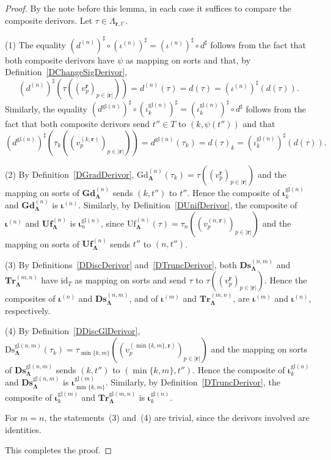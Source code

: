 \documentclass[a4paper, reqno
]{amsart}
\newcommand{\bb}[1]{\ensuremath{\lvert #1 \rvert}}
\newcommand{\sig}[1]{\mathbf{#1}}             %
\newcommand{\id}{\mathrm{id}}
\newcommand{\gl}{\mathrm{gl}}                %
\newcommand{\Gd}{\mathrm{Gd}}
\newcommand{\Uf}{\mathrm{Uf}}
\newcommand{\Ds}{\mathrm{Ds}}
\newcommand{\bGd}{\mathbf{Gd}}
\newcommand{\bUf}{\mathbf{Uf}}
\newcommand{\bDs}{\mathbf{Ds}}
\newcommand{\bTr}{\mathbf{Tr}}
\theoremstyle{plain}
\theoremstyle{definition}
\begin{document}
\begin{proof}
By the note before this lemma, in each case it suffices to compare the composite derivors.
Let $\tau\in\Lambda_{\mathbf{r},t'}$.

(1) The equality $(d^{(n)})^{\sharp}\circ(\iota^{(n)})^{\sharp}=(\iota^{(n)})^{\sharp}\circ d^{\sharp}$ follows from the fact that both composite derivors have $\psi$ as mapping on sorts and that, by Definition~\ref{DChangeSigDerivor},
$$
(d^{(n)})^{\sharp}\left(\tau\left((v^{\mathbf{r}}_{p})_{p\in\bb{\mathbf{r}}}\right)\right)=d^{(n)}(\tau)=d(\tau)=(\iota^{(n)})^{\sharp}(d(\tau)).
$$
Similarly, the equality $(d^{\gl(n)})^{\sharp}\circ(\iota^{\gl(n)}_{k})^{\sharp}=(\iota^{\gl(n)}_{k})^{\sharp}\circ d^{\sharp}$ follows from the fact that both composite derivors send $t''\in T$ to $(k,\psi(t''))$ and that
$$
(d^{\gl(n)})^{\sharp}\left(\tau_{k}\left((v^{(k,\mathbf{r})}_{p})_{p\in\bb{\mathbf{r}}}\right)\right)=d^{\gl(n)}(\tau_{k})=d(\tau)_{k}=(\iota^{\gl(n)}_{k})^{\sharp}(d(\tau)).
$$

(2) By Definition~\ref{DGradDerivor}, $\Gd^{(n)}_{\sig{\Lambda}}(\tau_{k})=\tau((v^{\mathbf{r}}_{p})_{p\in\bb{\mathbf{r}}})$ and the mapping on sorts of $\bGd^{(n)}_{\sig{\Lambda}}$ sends $(k,t'')$ to $t''$.
Hence the composite of $\boldsymbol{\iota}^{\gl(n)}_{k}$ and $\bGd^{(n)}_{\sig{\Lambda}}$ is $\boldsymbol{\iota}^{(n)}$.
Similarly, by Definition~\ref{DUnifDerivor}, the composite of $\boldsymbol{\iota}^{(n)}$ and $\bUf^{(n)}_{\sig{\Lambda}}$ is $\boldsymbol{\iota}^{\gl(n)}_{n}$, since $\Uf^{(n)}_{\sig{\Lambda}}(\tau)=\tau_{n}((v^{(n,\mathbf{r})}_{p})_{p\in\bb{\mathbf{r}}})$ and the mapping on sorts of $\bUf^{(n)}_{\sig{\Lambda}}$ sends $t''$ to $(n,t'')$.

(3) By Definitions~\ref{DDiscDerivor} and~\ref{DTruncDerivor}, both $\bDs^{(n,m)}_{\sig{\Lambda}}$ and $\bTr^{(m,n)}_{\sig{\Lambda}}$ have $\id_{T}$ as mapping on sorts and send $\tau$ to $\tau((v^{\mathbf{r}}_{p})_{p\in\bb{\mathbf{r}}})$.
Hence the composites of $\boldsymbol{\iota}^{(n)}$ and $\bDs^{(n,m)}_{\sig{\Lambda}}$, and of $\boldsymbol{\iota}^{(m)}$ and $\bTr^{(m,n)}_{\sig{\Lambda}}$, are $\boldsymbol{\iota}^{(m)}$ and $\boldsymbol{\iota}^{(n)}$, respectively.

(4) By Definition~\ref{DDiscGlDerivor}, $\Ds^{\gl(n,m)}_{\sig{\Lambda}}(\tau_{k})=\tau_{\min\{k,m\}}((v^{(\min\{k,m\},\mathbf{r})}_{p})_{p\in\bb{\mathbf{r}}})$ and the mapping on sorts of $\bDs^{\gl(n,m)}_{\sig{\Lambda}}$ sends $(k,t'')$ to $(\min\{k,m\},t'')$.
Hence the composite of $\boldsymbol{\iota}^{\gl(n)}_{k}$ and $\bDs^{\gl(n,m)}_{\sig{\Lambda}}$ is $\boldsymbol{\iota}^{\gl(m)}_{\min\{k,m\}}$.
Similarly, by Definition~\ref{DTruncDerivor}, the composite of $\boldsymbol{\iota}^{\gl(m)}_{k}$ and $\bTr^{\gl(m,n)}_{\sig{\Lambda}}$ is $\boldsymbol{\iota}^{\gl(n)}_{k}$.

For $m=n$, the statements~(3) and~(4) are trivial, since the derivors involved are identities.

This completes the proof.
\end{proof}
\end{document}
